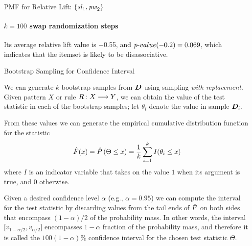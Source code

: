 \begin{frame}[fragile]{PMF for Relative Lift: $\{{\it sl}_1, {\it pw}_2\}$}
  \framesubtitle{$k=100$ swap randomization steps}

Its average
relative lift value is $-$0.55, and ${p\text{-}value}(-0.2) = 0.069$, which
indicates that the itemset is likely to be disassociative.

\medskip

\begin{center}
\begin{figure}[H]
\scalebox{0.85}{
\def\pshlabel#1{\small {$#1$}}
\def\psvlabel#1{\small {$#1$}}
        \centering
        \psset{xAxisLabel=Relative Lift,
          yAxisLabel=$\hf$,
          xAxisLabelPos={c,-0.3in}}%
    \psgraph[tickstyle=bottom,Dy=0.04,
        dy=0.04,Ox=-1.2,Dx=0.2,dx=0.2]{->}(-1.2,0)(0.2,0.2){3in}{2in}
          \listplot[plotstyle=LineToXAxis,linewidth=4pt,linecolor=gray]{\dPMF}
    \endpsgraph
    }
\end{figure}
\end{center}
\end{frame}



\begin{frame}{Bootstrap Sampling for Conf\/{i}dence Interval}

  We can generate $k$ bootstrap samples from ${\boldsymbol D}$ using
sampling {\em with replacement}.
Given pattern $X$ or rule $R:X\arule Y$,
we can obtain the value of the test statistic in each of the bootstrap
samples; let $\theta_i$ denote the value in sample ${\boldsymbol D}_i$.


\medskip
From these values we can generate the empirical cumulative distribution
function for the statistic
\begin{align*}
  \hat{F}(x) = \hat{P}\left(\Theta \le x\right) = \frac{1}{k} \sum_{i=1}^k
  I(\theta_i \le x)
\end{align*}
where $I$ is an indicator variable that takes on the value $1$ when its
argument is true, and $0$ otherwise.

\medskip
Given a desired conf\/{i}dence level
$\alpha$ (e.g., $\alpha=0.95$) we can compute
the interval for
the test statistic by discarding values from the tail ends of $\hat{F}$ on both sides
that encompass $(1-\alpha)/2$ of
the probability mass.
In other words, the interval
$\bigl[v_{1-\alpha/2}, v_{\alpha/2}\bigr]$ encompasses $1-\alpha$
fraction of the probability mass, and therefore it is called the
$100(1-\alpha)$\%
conf\/{i}dence interval for the chosen test statistic $\Theta$.

\end{frame}

